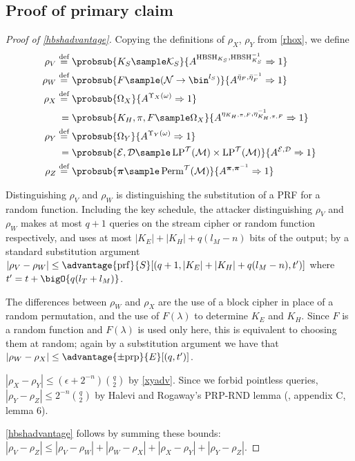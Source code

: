 \documentclass[eprint.tex]{subfiles}
\begin{document}
\subsection{Proof of primary claim}
\begin{proof}[Proof of \autoref{hbshadvantage}]\label{hbshproof}
    Copying the definitions of $\rho_X$, $\rho_Y$ from \autoref{rhox},
    we define
    \begin{align*}
        \rho_V \defeq{}& \probsub{K_S \sample \mathcal{K}_S}
            {A^{\HBSH_{K_S}, \HBSH_{K_S}^{-1}}\Rightarrow 1} \\
        \rho_W \defeq{}& \probsub{F \sample (\mathcal{N} \rightarrow \bin^{l_S})}
            {A^{\bar{\eta}_{F}, \bar{\eta}_{F}^{-1}}\Rightarrow 1} \\
        \rho_X \defeq{}& \probsub{\Omega_X}{A^{\Upsilon_X(\omega)} \Rightarrow 1} \\
            ={}&\probsub{K_H, \pi, F \sample \Omega_X}{A^{\eta_{K_H, \pi, F}, \eta_{K_H, \pi, F}^{-1}} \Rightarrow 1} \\
        \rho_Y \defeq{}& \probsub{\Omega_Y}{A^{\Upsilon_Y(\omega)} \Rightarrow 1} \\
            ={}&\probsub{\mathcal{E}, \mathcal{D} \sample \LP^\mathcal{T}(\mathcal{M}) \times \LP^\mathcal{T}(\mathcal{M})}{A^{\mathcal{E}, \mathcal{D}} \Rightarrow 1} \\
        \rho_Z \defeq{}& \probsub{\bm{\pi} \sample \Perm^\mathcal{T}(\mathcal{M})}
            {A^{\bm{\pi},\bm{\pi}^{-1}}\Rightarrow 1} \\
    \end{align*}

    Distinguishing
    $\rho_V$ and $\rho_W$ is distinguishing the substitution of a PRF
    for a random function.
    Including the key schedule, the attacker distinguishing
    $\rho_V$ and $\rho_W$ makes at most $q + 1$ queries on the stream cipher
    or random function respectively, and uses at most $|K_E| + |K_H| + q(l_M - n)$ bits
    of the output; by a standard substitution argument
    $|\rho_V - \rho_W| \leq
    \advantage{\mathrm{prf}}{S}[(q + 1, |K_E| + |K_H| + q(l_M - n), t')]$
    where $t' = t + \bigO{q(l_T + l_M)}$.

    The differences between $\rho_W$ and $\rho_X$ are the use of a block cipher
    in place of a random permutation, and the use of $F(\lambda)$ to determine
    $K_E$ and $K_H$. Since $F$ is a random function and $F(\lambda)$ is used
    only here, this is equivalent to choosing them at random; again by a substitution
    argument we have that $|\rho_W - \rho_X| \leq \advantage{\pm \mathrm{prp}}{E}[(q, t')]$.

    $|\rho_X - \rho_Y| \leq (\epsilon + 2^{-n})\binom{q}{2}$ by \autoref{xyadv}.
    Since we forbid pointless queries,
    $|\rho_Y - \rho_Z| \leq 2^{-n}\binom{q}{2}$ by Halevi and Rogaway's PRP-RND lemma
    (\cite{cmc}, appendix C, lemma 6).

    \autoref{hbshadvantage} follows by summing these bounds:
    $|\rho_V - \rho_Z| \leq
    |\rho_V - \rho_W| + |\rho_W - \rho_X| + |\rho_X - \rho_Y| + |\rho_Y - \rho_Z|$.
\end{proof}

\subbib
\end{document}
